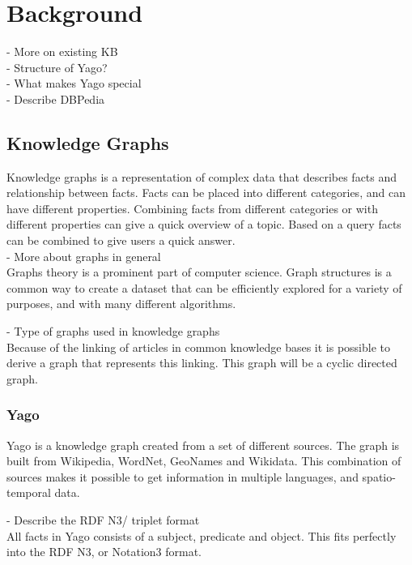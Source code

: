 
\chapter{Background}

- More on existing KB\\
- Structure of Yago?\\
- What makes Yago special\\
- Describe DBPedia\\

\section{Knowledge Graphs}
Knowledge graphs is a representation of complex data that describes facts and relationship between facts. Facts can be placed into different categories, and can have different properties. Combining facts from different categories or with different properties can give a quick overview of a topic. Based on a query facts can be combined to give users a quick answer.\\

- More about graphs in general\\
Graphs theory is a prominent part of computer science. Graph structures is a common way to create a dataset that can be efficiently explored for a variety of purposes, and with many different algorithms. 

- Type of graphs used in knowledge graphs\\
Because of the linking of articles in common knowledge bases it is possible to derive a graph that represents this linking. This graph will be a cyclic directed graph.


\subsection{Yago}
Yago\cite{yago} is a knowledge graph created from a set of different sources. The graph is built from Wikipedia, WordNet, GeoNames and Wikidata. This combination of sources makes it possible to get information in multiple languages, and spatio-temporal data.

- Describe the RDF N3/ triplet format\\
All facts in Yago consists of a subject, predicate and object. This fits perfectly into the RDF N3, or Notation3 format.

